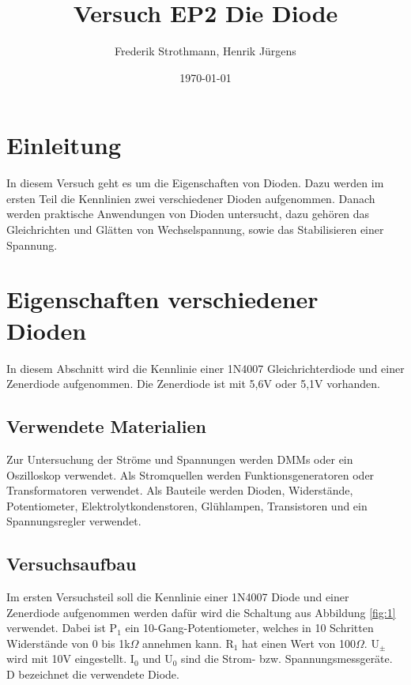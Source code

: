 \documentclass[12pt,a4paper]{article}
\title{Versuch EP2 Die Diode}
\author{Frederik Strothmann, Henrik Jürgens}
\date{\today}
\begin{document}
\maketitle
\newpage
\tableofcontents
\newpage
\section{Einleitung}
In diesem Versuch geht es um die Eigenschaften von Dioden. Dazu werden im ersten Teil die Kennlinien zwei verschiedener Dioden aufgenommen. Danach werden praktische Anwendungen von Dioden untersucht, dazu gehören das Gleichrichten und Glätten von Wechselspannung, sowie das Stabilisieren einer Spannung.
\section{Eigenschaften verschiedener Dioden}
In diesem Abschnitt wird die Kennlinie einer 1N4007 Gleichrichterdiode und einer Zenerdiode aufgenommen. Die Zenerdiode ist mit 5,6V oder 5,1V vorhanden.
\subsection{Verwendete Materialien}
Zur Untersuchung der Ströme und Spannungen werden DMMs oder ein Oszilloskop verwendet. Als Stromquellen werden Funktionsgeneratoren oder Transformatoren verwendet. Als Bauteile werden Dioden, Widerstände, Potentiometer, Elektrolytkondenstoren, Glühlampen, Transistoren und ein Spannungsregler verwendet.
\subsection{Versuchsaufbau}
Im ersten Versuchsteil soll die Kennlinie einer 1N4007 Diode und einer Zenerdiode aufgenommen werden dafür wird die Schaltung aus Abbildung \ref{fig:1} verwendet. Dabei ist P$_1$ ein 10-Gang-Potentiometer, welches in 10 Schritten Widerstände von 0 bis 1k$\Omega$ annehmen kann. R$_1$ hat einen Wert von 100$\Omega$. U$_\pm$ wird mit 10V eingestellt. I$_0$ und U$_0$ sind die Strom- bzw. Spannungsmessgeräte. D bezeichnet die verwendete Diode.
\end{document}
